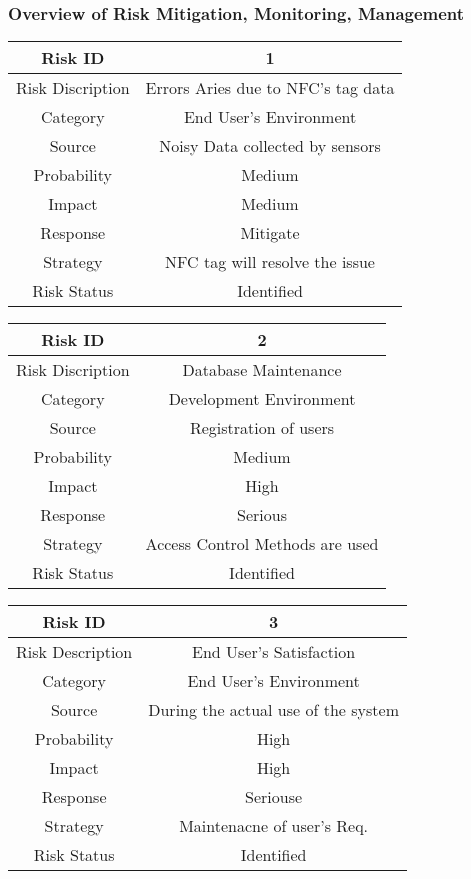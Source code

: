 \documentclass[10pt,a4paper]
{article}
\numberwithin{table}{section}
\begin{document}
{{\begin{normalsize}
\subsubsection{Overview of Risk Mitigation, Monitoring, Management}
\begin{center}
\def\arraystretch{1.5}
\begin{tabular}{|c|c|}
\hline 
Risk ID & 1 \\ 
\hline 
Risk Discription & Errors Aries due to NFC’s tag data \\ 
\hline 
Category & End User’s Environment \\ 
\hline 
Source & Noisy Data collected by sensors \\ 
\hline 
Probability & Medium \\ 
\hline 
Impact & Medium \\ 
\hline 
Response & Mitigate \\ 
\hline 
Strategy & NFC tag will resolve the issue\\ 
\hline 
Risk Status & Identified \\ 
\hline
\end{tabular} 
\end{center}


\begin{center}
\def\arraystretch{1.5}
\begin{tabular}{|c|c|}
\hline 
Risk ID & 2 \\ 
\hline 
Risk Discription &    Database Maintenance \\ 
\hline 
Category & Development Environment \\ 
\hline 
Source & Registration of users \\ 
\hline 
Probability & Medium \\ 
\hline 
Impact & High \\ 
\hline 
Response & Serious \\ 
\hline 
Strategy & Access Control Methods are used \\ 
\hline 
Risk Status & Identified \\ 
\hline 
\end{tabular}
\end{center}


\begin{center}
\def\arraystretch{1.5}
\begin{tabular}{|c|c|}
\hline 
Risk ID & 3 \\ 
\hline 
Risk Description & End  User's Satisfaction \\ 
\hline 
Category & End User's Environment \\ 
\hline 
Source & During the actual use of the system \\ 
\hline 
Probability & High \\ 
\hline 
Impact & High \\ 
\hline 
Response & Seriouse \\ 
\hline 
Strategy & Maintenacne of user's Req.\\ 
\hline 
Risk Status & Identified \\ 
\hline 
\end{tabular}
\end{center}



\end{normalsize}}}
\end{document}
